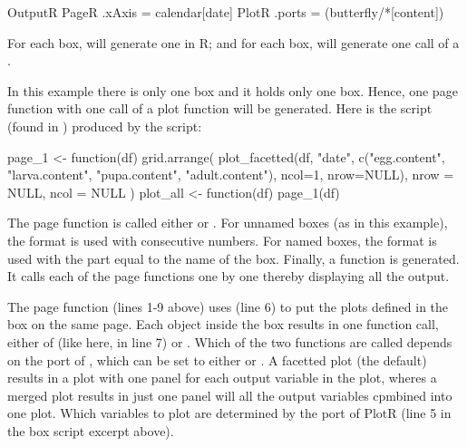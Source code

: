 \lstset{numbers=left}
\begin{boxscript}
OutputR {
  PageR {
    .xAxis = calendar[date]
    PlotR {
      .ports = (butterfly/*[content])
    }
  }
}\end{boxscript}
\lstset{numbers=none}

For each  box,  will generate one  in R; and for each  box,  will generate one call of a .

In this example there is only one  box and it holds only one  box. Hence, one page function with one call of a plot function will be generated. Here is the  script (found in ) produced by the  script:
\lstset{numbers=left}
\begin{rscript}
page_1 <- function(df) {
  grid.arrange(
    plot_facetted(df, "date", c("egg.content", 
      "larva.content", "pupa.content", "adult.content"),
      ncol=1, nrow=NULL),
    nrow = NULL,
    ncol = NULL
  )
}
plot_all <- function(df) {
  page_1(df)
}
\end{rscript}
\lstset{numbers=none}

The page function is called either  or . For unnamed  boxes (as in this example), the  format is used with consecutive numbers. For named  boxes, the  format is used with the  part equal to the name of the  box. Finally, a function  is generated. It calls each of the page functions one by one thereby displaying all the output.

The page function (lines 1-9 above) uses  (line 6) to put the plots defined in the  box on the same page. Each  object inside the  box results in one function call, either of  (like here, in line 7) or . Which of the two functions are called depends on the  port of , which can be set to either  or . A facetted plot (the default) results in a plot with one panel for each output variable in the plot, wheres a merged plot results in just one panel will all the output variables cpmbined into one plot. Which variables to plot are determined by the  port of PlotR (line 5 in the box script excerpt above).

